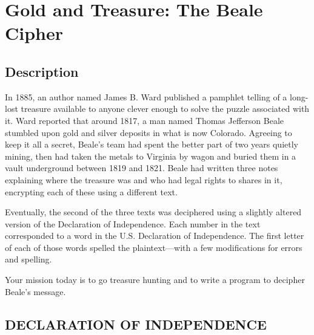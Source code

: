 \section{Gold and Treasure: The Beale Cipher}

\subsection*{Description}\label{description-17}

In 1885, an author named James B. Ward published a pamphlet telling of a
long-lost treasure available to anyone clever enough to solve the puzzle
associated with it. Ward reported that around 1817, a man named Thomas
Jefferson Beale stumbled upon gold and silver deposits in what is now
Colorado. Agreeing to keep it all a secret, Beale's team had spent the
better part of two years quietly mining, then had taken the metals to
Virginia by wagon and buried them in a vault underground between 1819
and 1821. Beale had written three notes explaining where the treasure
was and who had legal rights to shares in it, encrypting each of these
using a different text.

Eventually, the second of the three texts was deciphered using a
slightly altered version of the Declaration of Independence. Each number
in the text corresponded to a word in the U.S. Declaration of
Independence. The first letter of each of those words spelled the
plaintext---with a few modifications for errors and spelling.

Your mission today is to go treasure hunting and to write a program to
decipher Beale's message.

\subsection*{DECLARATION OF
INDEPENDENCE}\label{declaration-of-independence}

